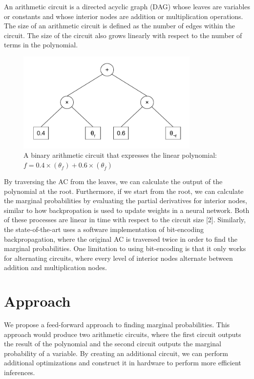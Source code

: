 \documentclass[11pt,a4paper, final, twoside]{article}
\theoremstyle{proposition}
\theoremstyle{definition}
\theoremstyle{remark}
\numberwithin{equation}{section}
\begin{document}
An arithmetic circuit is a directed acyclic graph (DAG) whose leaves are variables or constants and whose interior nodes are addition or multiplication operations. The size of an arithmetic circuit is defined as the number of edges within the circuit. The size of the circuit also grows linearly with respect to the number of terms in the polynomial. 

\begin{figure}[h]
    \caption{A binary arithmetic circuit that expresses the linear polynomial: $f=0.4\times(\theta_{f}) + 0.6\times(\theta_{\overline{f}})$}
    \centering
    \includegraphics[width=9cm]{ac_example.pdf}
\end{figure}
\newpage

By traversing the AC from the leaves, we can calculate the output of the polynomial at the root. Furthermore, if we start from the root, we can calculate the marginal probabilities by evaluating the partial derivatives for interior nodes, similar to how backpropation is used to update weights in a neural network. Both of these processes are linear in time with respect to the circuit size [2]. Similarly, the state-of-the-art uses a software implementation of bit-encoding backpropagation, where the original AC is traversed twice in order to find the marginal probabilities. One limitation to using bit-encoding is that it only works for alternating circuits, where every level of interior nodes alternate between addition and multiplication nodes.

\section{Approach}\label{I3}
We propose a feed-forward approach to finding marginal probabilities. This approach would produce two arithmetic circuits, where the first circuit outputs the result of the polynomial and the second circuit outputs the marginal probability of a variable. By creating an additional circuit, we can perform additional optimizations and construct it in hardware to perform more efficient inferences.
\end{document}

